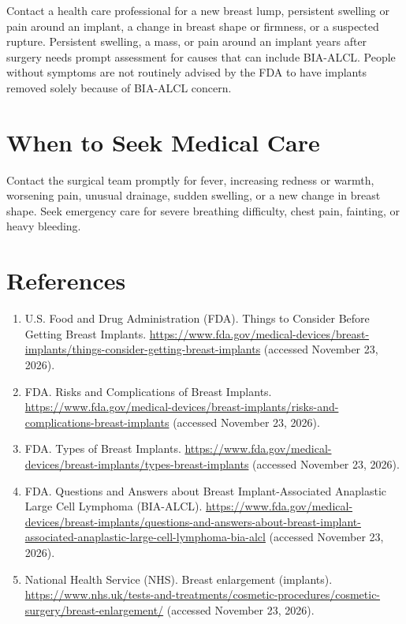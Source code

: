 Contact a health care professional for a new breast lump, persistent swelling or pain around an implant, a change in breast shape or firmness, or a suspected rupture. Persistent swelling, a mass, or pain around an implant years after surgery needs prompt assessment for causes that can include BIA-ALCL. People without symptoms are not routinely advised by the FDA to have implants removed solely because of BIA-ALCL concern.

\section*{When to Seek Medical Care}
Contact the surgical team promptly for fever, increasing redness or warmth, worsening pain, unusual drainage, sudden swelling, or a new change in breast shape. Seek emergency care for severe breathing difficulty, chest pain, fainting, or heavy bleeding.

\section*{References}
\begin{enumerate}
  \item U.S. Food and Drug Administration (FDA). Things to Consider Before Getting Breast Implants. \url{https://www.fda.gov/medical-devices/breast-implants/things-consider-getting-breast-implants} (accessed November 23, 2026).
  \item FDA. Risks and Complications of Breast Implants. \url{https://www.fda.gov/medical-devices/breast-implants/risks-and-complications-breast-implants} (accessed November 23, 2026).
  \item FDA. Types of Breast Implants. \url{https://www.fda.gov/medical-devices/breast-implants/types-breast-implants} (accessed November 23, 2026).
  \item FDA. Questions and Answers about Breast Implant-Associated Anaplastic Large Cell Lymphoma (BIA-ALCL). \url{https://www.fda.gov/medical-devices/breast-implants/questions-and-answers-about-breast-implant-associated-anaplastic-large-cell-lymphoma-bia-alcl} (accessed November 23, 2026).
  \item National Health Service (NHS). Breast enlargement (implants). \url{https://www.nhs.uk/tests-and-treatments/cosmetic-procedures/cosmetic-surgery/breast-enlargement/} (accessed November 23, 2026).
\end{enumerate}

\clearpage
